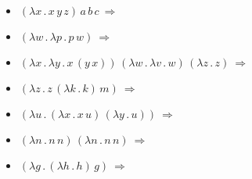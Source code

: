 \documentclass[addpoints]{exam}
\begin{document}
\begin{questions}
  \begin{itemize}
  \item $(\lambda x\,.\,x\,y\,z)\,a\,b\,c~\Rightarrow~$\fillin[ $(a\,y\,z)\,b\,c$ ][4cm]\\[1em]
  \item $(\lambda w\,.\,\lambda p\,.\,p\,w)~\Rightarrow~$\\[1em]
  \item $(\lambda x\,.\,\lambda y\,.\,x\,(y\,x))\,(\lambda w\,.\,\lambda v\,.\,w)\,(\lambda z\,.\,z)~\Rightarrow~$\\[1em]
  \item $(\lambda z\,.\,z\,(\lambda k\,.\,k)\,m)~\Rightarrow~$\\[1em]
  \item $(\lambda u\,.\,(\lambda x\,.\,x\,u)\,(\lambda y\,.\,u))~\Rightarrow~$\\[1em]
  \item $(\lambda n\,.\,n\,n)\,(\lambda n\,.\,n\,n)~\Rightarrow~$\\[1em]
  \item $(\lambda g\,.\,(\lambda h\,.\,h)\,g)~\Rightarrow~$\fillin[ $(\lambda g\,.\,g)$ ][4cm]\\[1em]
  \end{itemize}

\end{questions}
\end{document}
